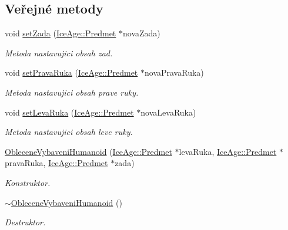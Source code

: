 \subsection*{Veřejné metody}
\begin{DoxyCompactItemize}
\item 
void \hyperlink{classIceAge_1_1ObleceneVybaveniHumanoid_ae81463b9f6e6bd01a8c367883b50e450}{set\+Zada} (\hyperlink{classIceAge_1_1Predmet}{Ice\+Age\+::\+Predmet} $\ast$nova\+Zada)
\begin{DoxyCompactList}\small\item\em Metoda nastavujici obsah zad. \end{DoxyCompactList}\item 
void \hyperlink{classIceAge_1_1ObleceneVybaveniHumanoid_a2e6b26315e6bab11d63e3386c8eb3242}{set\+Prava\+Ruka} (\hyperlink{classIceAge_1_1Predmet}{Ice\+Age\+::\+Predmet} $\ast$nova\+Prava\+Ruka)
\begin{DoxyCompactList}\small\item\em Metoda nastavujici obsah prave ruky. \end{DoxyCompactList}\item 
void \hyperlink{classIceAge_1_1ObleceneVybaveniHumanoid_a3f7f628310db32976843e34a32300bea}{set\+Leva\+Ruka} (\hyperlink{classIceAge_1_1Predmet}{Ice\+Age\+::\+Predmet} $\ast$nova\+Leva\+Ruka)
\begin{DoxyCompactList}\small\item\em Metoda nastavujici obsah leve ruky. \end{DoxyCompactList}\item 
\hyperlink{classIceAge_1_1ObleceneVybaveniHumanoid_aba55421b187ea1b6f4b6100208868c04}{Oblecene\+Vybaveni\+Humanoid} (\hyperlink{classIceAge_1_1Predmet}{Ice\+Age\+::\+Predmet} $\ast$leva\+Ruka, \hyperlink{classIceAge_1_1Predmet}{Ice\+Age\+::\+Predmet} $\ast$prava\+Ruka, \hyperlink{classIceAge_1_1Predmet}{Ice\+Age\+::\+Predmet} $\ast$zada)
\begin{DoxyCompactList}\small\item\em Konstruktor. \end{DoxyCompactList}\item 
\hyperlink{classIceAge_1_1ObleceneVybaveniHumanoid_ab018a5ab8e4c1570420db1ac2f3e6eaf}{$\sim$\+Oblecene\+Vybaveni\+Humanoid} ()
\begin{DoxyCompactList}\small\item\em Destruktor. \end{DoxyCompactList}\end{DoxyCompactItemize}
